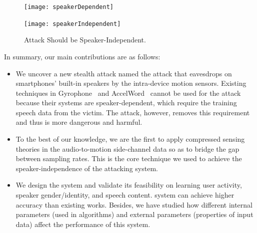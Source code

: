 \begin{landscape}
	\begin{figure}[h]%
		\centering
		\begin{minipage}[c]{.45\linewidth}
				\texttt{[image: speakerDependent]}
		\end{minipage}
		\begin{minipage}[t]{.05\textwidth}
			\qquad
		\end{minipage}
		\begin{minipage}[c]{.45\linewidth}
				\texttt{[image: speakerIndependent]}
		\end{minipage}
		\caption{{\attackName} Attack Should be Speaker-Independent.} \label{fig:depend}
	\end{figure}
\end{landscape}

In summary, our main contributions are as follows:
\begin{itemize}
	\item 
	We uncover a new stealth attack named the {\attackName} attack that eavesdrops on smartphones' built-in speakers by the intra-device motion sensors. Existing techniques in Gyrophone~\cite{michalevsky2014gyrophone} and AccelWord~\cite{zhang2015accelword} cannot be used for the {\attackName}  attack because their systems are speaker-dependent, which require the training speech data from the victim. The {\attackName}  attack, however, removes this requirement and thus is more dangerous and harmful.
	
	\item 
	To the best of our knowledge, we are the first to apply compressed sensing theories in the audio-to-motion side-channel data so as to bridge the gap between sampling rates. This is the core technique we used to achieve the speaker-independence of the attacking system.
	
	
	\item 
	We design the {\systemName} system and validate its feasibility on learning user activity, speaker gender/identity, and speech content.  {\systemName} system can achieve higher accuracy than existing works. Besides, we have studied how different internal parameters (used in algorithms) and external parameters (properties of input data) affect the  performance of this system.
	
\end{itemize}
